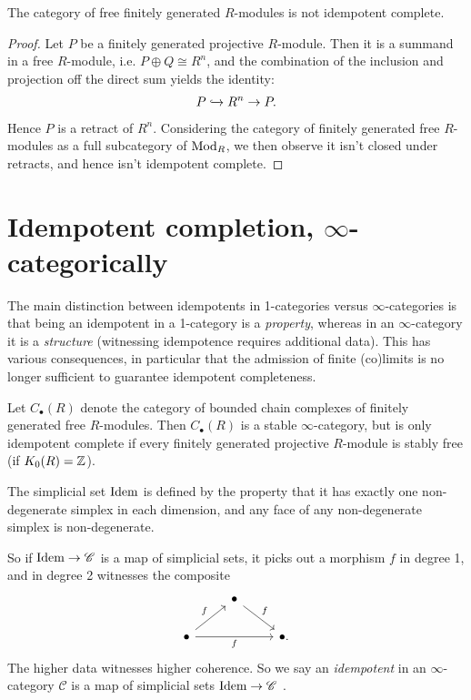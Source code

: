 \begin{example} The category of free finitely generated $R$-modules is not idempotent complete.
\end{example}
\begin{proof} Let $P$ be a finitely generated projective $R$-module. Then it is a summand in a free $R$-module, i.e. $P \oplus Q \cong R^n$, and the combination of the inclusion and projection off the direct sum yields the identity:
\begin{align*}
    P \xhookrightarrow{} R^n \to P.
\end{align*}
Hence $P$ is a retract of $R^n$. Considering the category of finitely generated free $R$-modules as a full subcategory of $\mathrm{Mod}_R$, we then observe it isn't closed under retracts, and hence isn't idempotent complete.
\end{proof}


\section{Idempotent completion, $\infty$-categorically}

The main distinction between idempotents in 1-categories versus $\infty$-categories is that being an idempotent in a 1-category is a \textit{property}, whereas in an $\infty$-category it is a \textit{structure} (witnessing idempotence requires additional data). This has various consequences, in particular that the admission of finite (co)limits is no longer sufficient to guarantee idempotent completeness.

\begin{example} \cite[4.4.5.1]{HTT} Let $C_\bullet(R)$ denote the category of bounded chain complexes of finitely generated free $R$-modules. Then $C_\bullet(R)$ is a stable $\infty$-category, but is only idempotent complete if every finitely generated projective $R$-module is stably free (if $K_0(R) = \mathbb{Z}$).
\end{example}

\begin{definition} \cite[4.4.5.3]{HTT} The simplicial set $\mathrm{Idem}$ is defined by the property that it has exactly one non-degenerate simplex in each dimension, and any face of any non-degenerate simplex is non-degenerate.
\end{definition}

So if $\mathrm{Idem} \to \mathscr{C}$ is a map of simplicial sets, it picks out a morphism $f$ in degree 1, and in degree 2 witnesses the composite
\[ \begin{tikzcd}
     & \bullet\ar[dr,"f" above right] & \\
    \bullet\ar[rr,"f" below]\ar[ur,"f" above left] &  & \bullet.
\end{tikzcd} \]
The higher data witnesses higher coherence. So we say an \textit{idempotent} in an $\infty$-category $\mathscr{C}$ is a map of simplicial sets $\mathrm{Idem} \to \mathscr{C}$ \cite[4.4.5.4]{HTT}.

